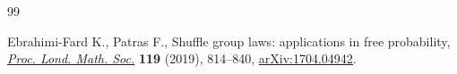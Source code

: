 \begin{thebibliography}{99}

Ebrahimi-Fard K., Patras F., Shuffle group laws: applications in free
 probability, \href{https://doi.org/10.1112/plms.12249}{\textit{Proc. Lond. Math. Soc.}} \textbf{119} (2019), 814--840,
 \href{https://arxiv.org/abs/1704.04942}{arXiv:1704.04942}.

\end{thebibliography}

